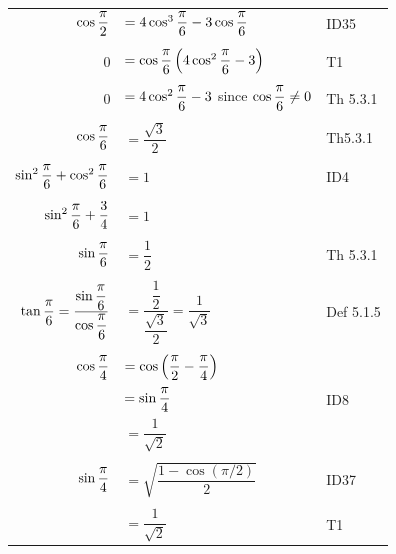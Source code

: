 \begin{tabular}{r l l}
$\cos \dfrac{\pi}{2}$&$= 4\cos^{3}\dfrac{\pi}{6} - 3\cos\dfrac{\pi}{6}$&ID35\\
&&\\
0&$=\cos\dfrac{\pi}{6}\left(4\cos^{2}\dfrac{\pi}{6} - 3\right)$&T1\\
&&\\
0&$= 4\cos^{2}\dfrac{\pi}{6} - 3$ since $\cos \dfrac{\pi}{6}\neq 0$ &Th 5.3.1\\
&&\\
$\cos \dfrac{\pi}{6}$&$=\dfrac{\sqrt{3}}{2}$&Th5.3.1\\
&&\\
$\sin^{2}\dfrac{\pi}{6} + \cos^{2}\dfrac{\pi}{6}$& $= 1$&ID4\\
&&\\
$\sin^{2}\dfrac{\pi}{6} + \dfrac{3}{4}$&$ = 1$&\\
&&\\
$\sin\dfrac{\pi}{6}$&$= \dfrac{1}{2}$& Th 5.3.1\\
&&\\
$\tan \dfrac{\pi}{6} = \dfrac{\sin \dfrac{\pi}{6}}{\cos \dfrac{\pi}{6}}$&$ = \dfrac{\dfrac{1}{2}}{\dfrac{\sqrt{3}}{2}} = \dfrac{1}{\sqrt{3}}$& Def 5.1.5\\
&&\\

$\cos\dfrac{\pi}{4}$&$= \cos\left(\dfrac{\pi}{2} - \dfrac{\pi}{4}\right)$&\\

&$= \sin\dfrac{\pi}{4}$&ID8\\

&$= \dfrac{1}{\sqrt{2}}$&\\

&&\\
$\sin \dfrac{\pi}{4}$& $= \sqrt{\dfrac{1 - \cos(\pi / 2)}{2}}$&ID37\\
&&\\

&$=\dfrac{1}{\sqrt{2}}$&T1\\

\end{tabular}\\


\newpage

